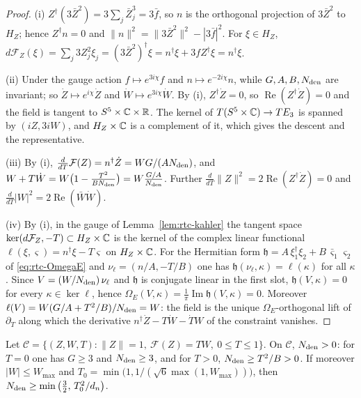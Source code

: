 \begin{proof}
(i) $Z^\dagger(3\bar Z^2)=3\sum_j\bar Z_j^3=3\bar f$, so $n$ is the orthogonal projection of $3\bar Z^2$ to $H_Z$; hence $Z^\dagger n=0$
and $\|n\|^2=\|3\bar Z^2\|^2-|3\bar f|^2$. For $\xi\in H_Z$,
$d\mathcal F_Z(\xi)=\sum_j3Z_j^2\xi_j=(3\bar Z^2)^\dagger\xi=n^\dagger\xi+3fZ^\dagger\xi=n^\dagger\xi$.

(ii) Under the gauge action $f\mapsto e^{3i\chi}f$ and $n\mapsto e^{-2i\chi}n$, while $G,A,B,N_{\rm den}$ are invariant; so
$\dot Z\mapsto e^{i\chi}\dot Z$ and $\dot W\mapsto e^{3i\chi}\dot W$. By (i), $Z^\dagger\dot Z=0$, so $\operatorname{Re}(Z^\dagger\dot Z)=0$ and the
field is tangent to $S^5\times\mathbb{C}\times\mathbb{R}$. The kernel of $T(S^5\times\mathbb{C})\to TE_3$ is spanned by $(iZ,3iW)$, and $H_Z\times\mathbb{C}$ is a
complement of it, which gives the descent and the representative.

(iii) By (i), $\frac{d}{dT}\mathcal F(Z)=n^\dagger\dot Z=WG/(AN_{\rm den})$, and
$W+T\dot W=W\big(1-\frac{T^2}{BN_{\rm den}}\big)=W\frac{G/A}{N_{\rm den}}$. Further $\frac{d}{dT}\|Z\|^2=2\operatorname{Re}(Z^\dagger\dot Z)=0$ and
$\frac{d}{dT}|W|^2=2\operatorname{Re}(\bar W\dot W)$.

(iv) By (i), in the gauge of Lemma~\ref{lem:rtc-kahler} the tangent space $\ker(d\mathcal F_Z,-T)\subset H_Z\times\mathbb{C}$ is the kernel of the complex linear
functional $\ell(\xi,\varsigma)=n^\dagger\xi-T\varsigma$ on $H_Z\times\mathbb{C}$. For the Hermitian form
$\mathfrak h=A\,\xi_1^\dagger\xi_2+B\,\bar\varsigma_1\varsigma_2$ of \eqref{eq:rtc-OmegaE} and $\nu_\ell=(n/A,-T/B)$ one has
$\mathfrak h(\nu_\ell,\kappa)=\ell(\kappa)$ for all $\kappa$. Since $V=(W/N_{\rm den})\,\nu_\ell$ and $\mathfrak h$ is conjugate linear in the first
slot, $\mathfrak h(V,\kappa)=0$ for every $\kappa\in\ker\ell$, hence $\Omega_E(V,\kappa)=\frac1\pi\operatorname{Im}\mathfrak h(V,\kappa)=0$.
Moreover $\ell(V)=W(G/A+T^2/B)/N_{\rm den}=W$: the field is the unique $\Omega_E$-orthogonal lift of $\partial_T$ along which the
derivative $n^\dagger\dot Z-T\dot W-\dot TW$ of the constraint vanishes.
\end{proof}

\begin{lemma}[Denominator]\label{lem:rtc-denominator}
Let $\mathcal C=\{(Z,W,T):\|Z\|=1,\ \mathcal F(Z)=TW,\ 0\le T\le1\}$. On $\mathcal C$, $N_{\rm den}>0$: for $T=0$ one has $G\ge3$
and $N_{\rm den}\ge3$, and for $T>0$, $N_{\rm den}\ge T^2/B>0$. If moreover $|W|\le W_{\max}$ and
$T_0=\min\big(1,1/(\sqrt6\max(1,W_{\max}))\big)$, then $N_{\rm den}\ge\min\big(\frac32,\,T_0^2/d_n\big)$.
\end{lemma}

